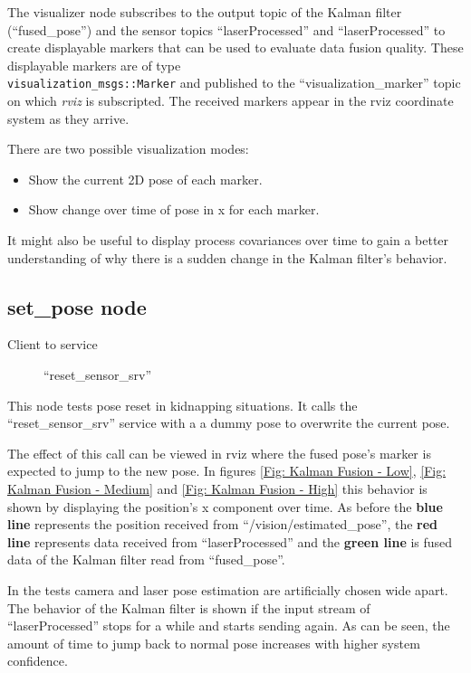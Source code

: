The visualizer node subscribes to the output topic of the Kalman filter (``fused\_pose'') and the sensor topics ``laserProcessed'' and ``laserProcessed'' to create displayable markers that can be used to evaluate data fusion quality. These displayable markers are of type \\ \texttt{visualization\_msgs::Marker} and published to the ``visualization\_marker'' topic on which \textit{rviz} is subscripted. The received markers appear in the rviz coordinate system as they arrive.

There are two possible visualization modes:

\begin{itemize}
\item Show the current 2D pose of each marker.
\item Show change over time of pose in x for each marker.
\end{itemize}

It might also be useful to display process covariances over time to gain a better understanding of why there is a sudden change in the Kalman filter's behavior.

\subsection{set\_pose node}
\begin{description}
\item[Client to service] ``reset\_sensor\_srv''
\end{description}
This node tests pose reset in kidnapping situations. It calls the ``reset\_sensor\_srv'' service with a a dummy pose to overwrite the current pose.

The effect of this call can be viewed in rviz where the fused pose's marker is expected to jump to the new pose. In figures \ref{Fig: Kalman Fusion - Low}, \ref{Fig: Kalman Fusion - Medium} and \ref{Fig: Kalman Fusion - High} this behavior is shown by displaying the position's x component over time. As before the \textbf{blue line} represents the position received from ``/vision/estimated\_pose'', the \textbf{red line} represents data received from ``laserProcessed'' and the \textbf{green line} is fused data of the Kalman filter read from ``fused\_pose''.

In the tests camera and laser pose estimation are artificially chosen wide apart. The behavior of the Kalman filter is shown if the input stream of ``laserProcessed'' stops for a while and starts sending again. As can be seen, the amount of time to jump back to normal pose increases with higher system confidence.

